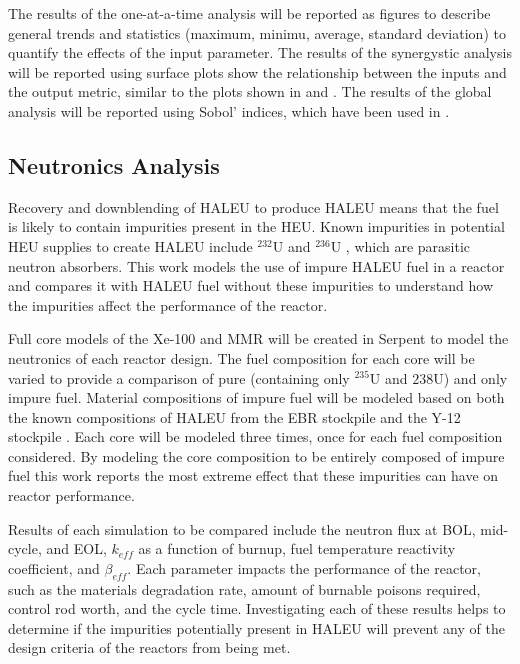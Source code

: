 The results of the one-at-a-time analysis will be reported as figures 
to describe general trends and statistics (maximum, minimu, average, 
standard deviation) to quantify the effects of the input parameter. 
The results 
of the synergystic analysis will be reported using surface plots show 
the relationship 
between the inputs and the output metric, similar to the plots shown in 
\cite{chee_sensitivity_2019} and \cite{passerini_systematic_2014}.
The results of the global analysis will be reported using Sobol' 
indices, which have been used in \cite{richards_application_2021}. 

\subsection{Neutronics Analysis}
Recovery and downblending of \gls{HALEU} to produce \gls{HALEU} means that 
the fuel is likely to contain impurities present in the 
\gls{HEU}. Known impurities in potential \gls{HEU}
supplies to create \gls{HALEU} include $^{232}$U and $^{236}$U
\cite{vaden_isotopic_2018,nelson_foreign_2010},  
which are parasitic neutron absorbers. This work models the use of 
impure \gls{HALEU} fuel in a reactor and compares it with \gls{HALEU} fuel 
without these impurities to understand how the impurities affect 
the performance of the reactor. 

Full core models of the Xe-100 and \gls{MMR} will be created in Serpent 
\cite{leppanen_serpent_2014} to model the neutronics of each reactor 
design. The fuel composition for each core will be varied to provide 
a comparison of pure (containing only $^{235}$U and ${238}$U) and only 
impure fuel.
Material compositions of impure fuel will be modeled based on both the 
known compositions of \gls{HALEU} from the \gls{EBR} stockpile 
\cite{vaden_isotopic_2018} and the Y-12 stockpile \cite{nelson_foreign_2010}.
Each core will be modeled three times, once for each fuel composition considered.
By modeling the core composition to be entirely composed of impure fuel 
this work reports the most extreme effect that these impurities can 
have on reactor performance.  

Results of each simulation to be compared include the neutron flux at 
\gls{BOL}, mid-cycle, and \gls{EOL}, $k_{eff}$ as a function of burnup, 
fuel temperature reactivity coefficient, and 
$\beta_{eff}$. Each parameter impacts the performance of 
the reactor, such as the materials degradation rate, amount of burnable 
poisons required, control rod worth, and the cycle time. Investigating 
each of these results helps to determine if the impurities potentially 
present in \gls{HALEU} will prevent any of the design criteria of the 
reactors from being met. 